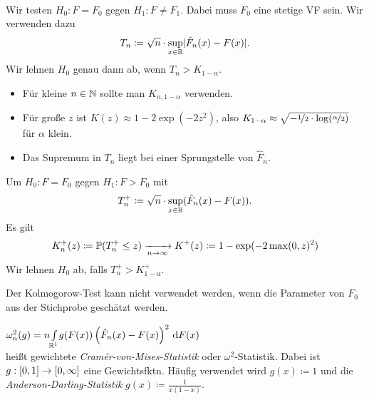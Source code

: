 \documentclass{cheat-sheet}
\renewcommand{\P}{\mathbb{P}} %
\begin{document}
\begin{entscheidungsregel} \mbox{}\\
  Wir testen $H_0 : F = F_0$ gegen $H_1 : F \neq F_1$.
  Dabei muss $F_0$ eine stetige VF sein.
  Wir verwenden dazu
  \[ T_n \coloneqq \sqrt{n} \cdot \sup_{x \in \mathbb{R}} \lvert\hat{F}_n(x) - F(x)\rvert. \]
  Wir lehnen $H_0$ genau dann ab, wenn $T_n > K_{1-\alpha}$.
\end{entscheidungsregel}

\begin{bemn}
  \begin{itemize}
    \item Für kleine $n \in \mathbb{N}$ sollte man $K_{n,1-\alpha}$ verwenden.
    \item Für große $z$ ist $K(z) \approx 1 - 2 \exp(-2 z^2)$, also $K_{1-\alpha} \approx \sqrt{- \nicefrac{1}{2} \cdot \log(\nicefrac{\alpha}{2})}$ für $\alpha$ klein.
    \item Das Supremum in $T_n$ liegt bei einer Sprungstelle von $\hat{F}_n$.
  \end{itemize}
\end{bemn}

\begin{entscheidungsregel}
  Um $H_0 : F = F_0$ gegen $H_1 : F > F_0$ mit %
  \[ T_n^{+} \coloneqq \sqrt{n} \cdot \sup_{x \in \mathbb{R}} (\hat{F}_n(x) - F(x)). \]
  Es gilt
  \[ K_n^{+}(z) \coloneqq \P(T_n^{+} \leq z) \xra[n \to \infty]{} K^{+}(z) \coloneqq 1 - \exp(-2 \max(0, z)^2) \]
  Wir lehnen $H_0$ ab, falls $T_n^{+} > K^+_{1-\alpha}$.
\end{entscheidungsregel}

\begin{acht}
  Der Kolmogorow-Test kann nicht verwendet werden, wenn die Parameter von $F_0$ aus der Stichprobe geschätzt werden.
\end{acht}




\begin{defn}
  $\omega_n^2(g) = n {\textstyle \int\limits_{\mathbb{R}^1}^{}} g(F(x)) \left( \hat{F}_n(x) - F(x) \right)^2 \,\mathrm{d} F(x)$ \\
  heißt gewichtete \emph{Cramér-von-Mises-Statistik} oder $\omega^2$-Statistik.
  Dabei ist $g : \left[ 0, 1 \right] \to \left[ 0, \infty \right]$ eine Gewichtsfktn.
  Häufig verwendet wird
  $g(x) \coloneqq 1$
  und die \emph{Anderson-Darling-Statistik} $g(x) \coloneqq \tfrac{1}{x (1-x)}$.
\end{defn}
\end{document}
